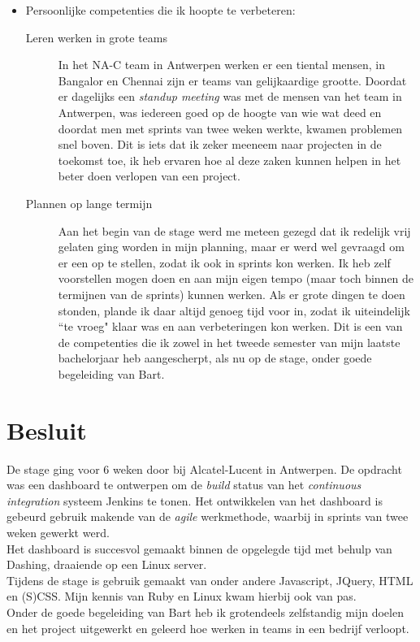 \documentclass[10pt,a4paper]{article}
\begin{document}
\begin{itemize}
\begin{description}
\end{description}
\item Persoonlijke competenties die ik hoopte te verbeteren:
\begin{description}
\item[Leren werken in grote teams] In het NA-C team in Antwerpen werken er een tiental mensen, in Bangalor en Chennai zijn er teams van gelijkaardige grootte. Doordat er dagelijks een \textit{standup meeting} was met de mensen van het team in Antwerpen, was iedereen goed op de hoogte van wie wat deed en doordat men met sprints van twee weken werkte, kwamen problemen snel boven. Dit is iets dat ik zeker meeneem naar projecten in de toekomst toe, ik heb ervaren hoe al deze zaken kunnen helpen in het beter doen verlopen van een project.
\item[Plannen op lange termijn] Aan het begin van de stage werd me meteen gezegd dat ik redelijk vrij gelaten ging worden in mijn planning, maar er werd wel gevraagd om er een op te stellen, zodat ik ook in sprints kon werken. Ik heb zelf voorstellen mogen doen en aan mijn eigen tempo (maar toch binnen de termijnen van de sprints) kunnen werken. Als er grote dingen te doen stonden, plande ik daar altijd genoeg tijd voor in, zodat ik uiteindelijk ``te vroeg" klaar was en aan verbeteringen kon werken. Dit is een van de competenties die ik zowel in het tweede semester van mijn laatste bachelorjaar heb aangescherpt, als nu op de stage, onder goede begeleiding van Bart.  
\end{description}
\end{itemize}

\section{Besluit}
\label{besluit}
De stage ging voor 6 weken door bij Alcatel-Lucent in Antwerpen. De opdracht was een dashboard te ontwerpen om de \textit{build} status van het \textit{continuous integration} systeem Jenkins te tonen. Het ontwikkelen van het dashboard is gebeurd gebruik makende van de \textit{agile} werkmethode, waarbij in sprints van twee weken gewerkt werd.\\
Het dashboard is succesvol gemaakt binnen de opgelegde tijd met behulp van Dashing, draaiende op een Linux server.\\
Tijdens de stage is gebruik gemaakt van onder andere Javascript, JQuery, HTML en (S)CSS. Mijn kennis van Ruby en Linux kwam hierbij ook van pas.\\
Onder de goede begeleiding van Bart heb ik grotendeels zelfstandig mijn doelen en het project uitgewerkt en geleerd hoe werken in teams in een bedrijf verloopt.
\end{document}
